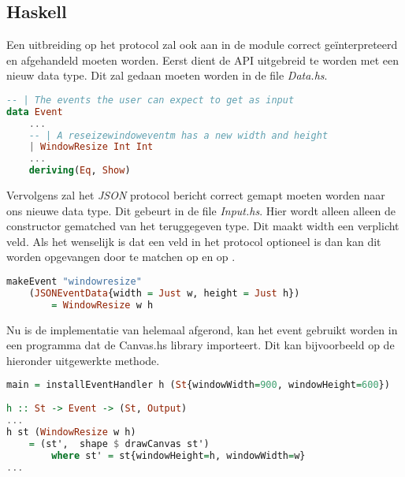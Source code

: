 \subsection{Haskell}
Een uitbreiding op het protocol zal ook aan in de module correct geïnterpreteerd en afgehandeld moeten worden. Eerst dient de API uitgebreid te worden met een nieuw data type. Dit zal gedaan moeten worden in de file \emph{Data.hs}.
\begin{lstlisting}[language=Haskell]
-- | The events the user can expect to get as input
data Event
    ...
    -- | A reseizewindoweventm has a new width and height
    | WindowResize Int Int
    ...
    deriving(Eq, Show)
\end{lstlisting}
Vervolgens zal het \emph{JSON} protocol bericht correct gemapt moeten worden naar ons nieuwe data type. Dit gebeurt in de file \emph{Input.hs}. Hier wordt alleen alleen de  constructor gematched van het teruggegeven  type. Dit maakt width een verplicht veld. Als het wenselijk is dat een veld in het protocol optioneel is dan kan dit worden opgevangen door te matchen op  en op .
\begin{lstlisting}[language=Haskell]
makeEvent "windowresize"
    (JSONEventData{width = Just w, height = Just h})
        = WindowResize w h
\end{lstlisting}
Nu is de implementatie van  helemaal afgerond, kan het event gebruikt worden in een programma dat de Canvas.hs library importeert. Dit kan bijvoorbeeld op de hieronder uitgewerkte methode.
\begin{lstlisting}[language=Haskell]
main = installEventHandler h (St{windowWidth=900, windowHeight=600})
 
h :: St -> Event -> (St, Output)
...
h st (WindowResize w h)
    = (st',  shape $ drawCanvas st')
        where st' = st{windowHeight=h, windowWidth=w}
...
\end{lstlisting}


